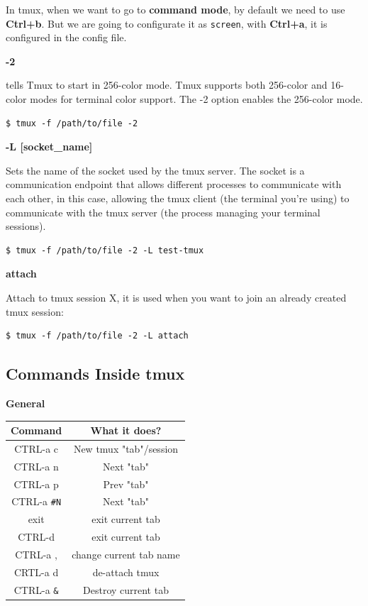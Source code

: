 \documentclass{article}
\newenvironment{codetemplate}[1][]{%
  \mybasecolorbox[#1]
  \itshape
}{%
  \endmybasecolorbox
}
\begin{document}
In tmux, when we want to go to \textbf{command mode}, by default we need to use \textbf{Ctrl+b}. But we are going to configurate it as \verb|screen|, with \textbf{Ctrl+a}, it is configured in the config file.

\textbf{-2}

tells Tmux to start in 256-color mode. Tmux supports both 256-color and 16-color modes for terminal color support. The -2 option enables the 256-color mode.

\begin{codetemplate}
\begin{verbatim}
$ tmux -f /path/to/file -2
\end{verbatim}
\end{codetemplate}

\textbf{-L [socket\_name]}

Sets the name of the socket used by the tmux server. The socket is a communication endpoint that allows different processes to communicate with each other, in this case, allowing the tmux client (the terminal you're using) to communicate with the tmux server (the process managing your terminal sessions).

\begin{codetemplate}
\begin{verbatim}
$ tmux -f /path/to/file -2 -L test-tmux
\end{verbatim}
\end{codetemplate}

\textbf{attach}

Attach to tmux session X, it is used when you want to join an already created tmux session:

\begin{codetemplate}
\begin{verbatim}
$ tmux -f /path/to/file -2 -L attach
\end{verbatim}
\end{codetemplate}

\subsection{Commands Inside tmux}
\textbf{General}
\begin{table}[H]
\begin{tabular}{| c  |c  |}
\hline
\textbf{Command} & \textbf{What it does?} \\ \hline
CTRL-a c & New tmux "tab"/session \\
CTRL-a n & Next "tab" \\
CTRL-a p & Prev "tab" \\
CTRL-a \verb|#N| & Next "tab" \\
exit & exit current tab \\
CTRL-d & exit current tab \\
CTRL-a , & change current tab name \\
CRTL-a d & de-attach tmux \\
CTRL-a \verb|&| & Destroy current tab \\
\hline
\end{tabular}
\end{table}
\end{document}
